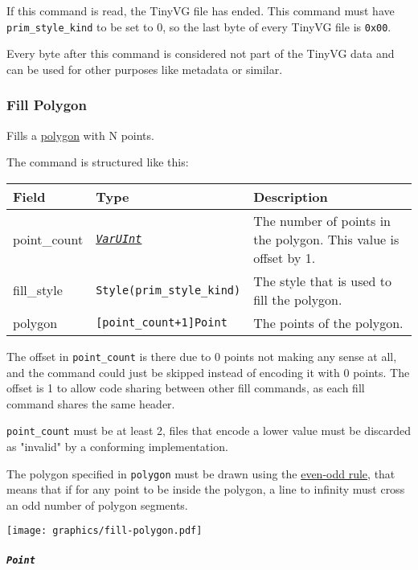 \documentclass[]{article}
\newcommand{\link}[2]{\hyperlink{#1}{\emph{#2}}}
\begin{document}
If this command is read, the TinyVG file has ended. This command must
have \texttt{prim\_style\_kind} to be set to 0, so the last byte of
every TinyVG file is \texttt{0x00}.

Every byte after this command is considered not part of the TinyVG data
and can be used for other purposes like metadata or similar.

\hypertarget{fill-polygon}{\subsubsection{Fill Polygon}\label{fill-polygon}}

Fills a \href{https://en.wikipedia.org/wiki/Polygon}{polygon} with N points.

The command is structured like this:

\begin{longtable}[]{@{}p{1in}p{2in}p{3in}@{}}
\toprule
Field & Type & Description \\
\midrule
\endhead
point\_count & \link{varuint}{\texttt{VarUInt}}   & The number of points in the polygon. This value is offset by 1. \\
fill\_style  & \texttt{Style(prim\_style\_kind)}  & The style that is used to fill the polygon.\\
polygon      & \texttt{{[}point\_count+1{]}Point} & The points of the polygon. \\
\bottomrule
\end{longtable}

The offset in \texttt{point\_count} is there due to 0 points not making
any sense at all, and the command could just be skipped instead of encoding
it with 0 points. The offset is 1 to allow code sharing between other
fill commands, as each fill command shares the same header.

\texttt{point\_count} must be at least 2, files that encode a lower
value must be discarded as "invalid" by a conforming implementation.

The polygon specified in \texttt{polygon} must be drawn using the
\href{https://en.wikipedia.org/wiki/Even\%E2\%80\%93odd_rule}{even-odd
rule}, that means that if for any point to be inside the polygon, a line
to infinity must cross an odd number of polygon segments.

\begin{center}
\texttt{[image: graphics/fill-polygon.pdf]}
\end{center}

\hypertarget{point}{\subparagraph{\texorpdfstring{\texttt{Point}}{Point}}\label{point}}
\end{document}
